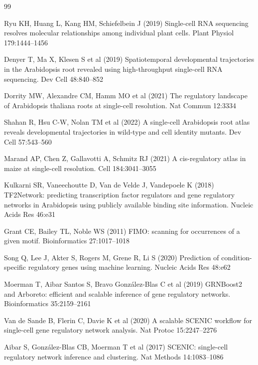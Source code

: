 \begin{thebibliography}{99}
\setlength{\itemsep}{2pt}

 Ryu KH, Huang L, Kang HM, Schiefelbein J (2019) Single-cell RNA sequencing resolves molecular relationships among individual plant cells. Plant Physiol 179:1444--1456

 Denyer T, Ma X, Klesen S et al (2019) Spatiotemporal developmental trajectories in the Arabidopsis root revealed using high-throughput single-cell RNA sequencing. Dev Cell 48:840--852

 Dorrity MW, Alexandre CM, Hamm MO et al (2021) The regulatory landscape of Arabidopsis thaliana roots at single-cell resolution. Nat Commun 12:3334

 Shahan R, Hsu C-W, Nolan TM et al (2022) A single-cell Arabidopsis root atlas reveals developmental trajectories in wild-type and cell identity mutants. Dev Cell 57:543--560

 Marand AP, Chen Z, Gallavotti A, Schmitz RJ (2021) A cis-regulatory atlas in maize at single-cell resolution. Cell 184:3041--3055

 Kulkarni SR, Vaneechoutte D, Van de Velde J, Vandepoele K (2018) TF2Network: predicting transcription factor regulators and gene regulatory networks in Arabidopsis using publicly available binding site information. Nucleic Acids Res 46:e31

 Grant CE, Bailey TL, Noble WS (2011) FIMO: scanning for occurrences of a given motif. Bioinformatics 27:1017--1018

 Song Q, Lee J, Akter S, Rogers M, Grene R, Li S (2020) Prediction of condition-specific regulatory genes using machine learning. Nucleic Acids Res 48:e62

 Moerman T, Aibar Santos S, Bravo Gonz\'alez-Blas C et al (2019) GRNBoost2 and Arboreto: efficient and scalable inference of gene regulatory networks. Bioinformatics 35:2159--2161

 Van de Sande B, Flerin C, Davie K et al (2020) A scalable SCENIC workflow for single-cell gene regulatory network analysis. Nat Protoc 15:2247--2276

 Aibar S, Gonz\'alez-Blas CB, Moerman T et al (2017) SCENIC: single-cell regulatory network inference and clustering. Nat Methods 14:1083--1086


\end{thebibliography}
